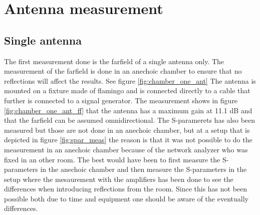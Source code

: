 \chapter{Antenna measurement}\label{ch:ant_meas}

\section{Single antenna}
The first measurement done is the farfield of a single antenna only. The measurement  of the farfield is done in an anechoic chamber to ensure that no reflections will affect the results. See figure \ref{fig:chamber_one_ant} The antenna is mounted on a fixture made of flamingo and is connected directly to a cable that further is connected to a signal generator. The measurement shows in figure \ref{fig:chamber_one_ant_ff} that the antenna has a maximum gain at 11.1 dB and that the farfield can be assumed omnidirectional. The S-paramerets has also been measured but those are not done in an anechoic chamber, but at a setup that is depicted in figure \ref{fig:spar_meas} the reason is that it was not possible to do the measurement in an anechoic chamber because of the network analyzer who was fixed in an other room. The best would have been to first measure the S-parameters in the anechoic chamber and then measure the S-parameters in the setup where the mesaurement with the amplifiers has been done to see the differences when introducing reflections from the room. Since this has not been possible both due to time and equipment one should be aware of the eventually differences.     

